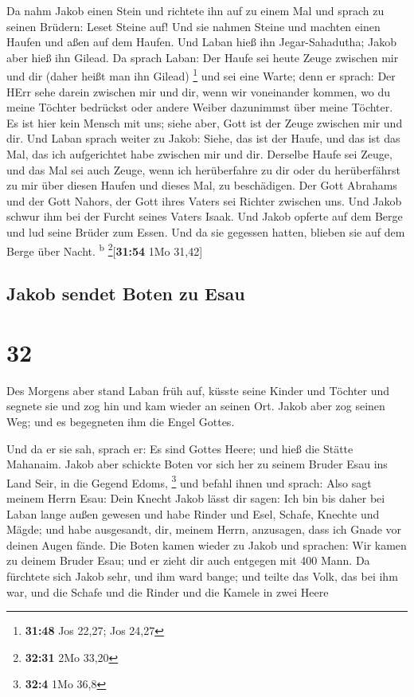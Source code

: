  Da nahm Jakob einen Stein und richtete ihn auf zu einem
Mal  und sprach zu seinen Brüdern: Leset Steine auf! Und
sie nahmen Steine und machten einen Haufen und aßen auf dem Haufen.
 Und Laban hieß ihn Jegar-Sahadutha; Jakob aber hieß ihn
Gilead.  Da sprach Laban: Der Haufe sei heute Zeuge
zwischen mir und dir (daher heißt man ihn Gilead) \footnote{\textbf{31:48}
  Jos 22,27; Jos 24,27}  und sei eine Warte; denn er
sprach: Der HErr sehe darein zwischen mir und dir, wenn wir voneinander
kommen,  wo du meine Töchter bedrückst oder andere Weiber
dazunimmst über meine Töchter. Es ist hier kein Mensch mit uns; siehe
aber, Gott ist der Zeuge zwischen mir und dir.  Und Laban
sprach weiter zu Jakob: Siehe, das ist der Haufe, und das ist das Mal,
das ich aufgerichtet habe zwischen mir und dir.  Derselbe
Haufe sei Zeuge, und das Mal sei auch Zeuge, wenn ich herüberfahre zu
dir oder du herüberfährst zu mir über diesen Haufen und dieses Mal, zu
beschädigen.  Der Gott Abrahams und der Gott Nahors, der
Gott ihres Vaters sei Richter zwischen uns.  Und Jakob
schwur ihm bei der Furcht seines Vaters Isaak. Und Jakob opferte auf dem
Berge und lud seine Brüder zum Essen. Und da sie gegessen hatten,
blieben sie auf dem Berge über Nacht. \textsuperscript{b}
\footnote{\textbf{32:31} 2Mo 33,20}{[}\textbf{31:54} 1Mo 31,42{]}

\hypertarget{jakob-sendet-boten-zu-esau}{%
\subsection{Jakob sendet Boten zu
Esau}\label{jakob-sendet-boten-zu-esau}}

\hypertarget{section-31}{%
\section{32}\label{section-31}}

 Des Morgens aber stand Laban früh auf, küsste seine
Kinder und Töchter und segnete sie und zog hin und kam wieder an seinen
Ort.  Jakob aber zog seinen Weg; und es begegneten ihm die
Engel Gottes.

 Und da er sie sah, sprach er: Es sind Gottes Heere; und
hieß die Stätte Mahanaim.  Jakob aber schickte Boten vor
sich her zu seinem Bruder Esau ins Land Seir, in die Gegend Edoms,
\footnote{\textbf{32:4} 1Mo 36,8}  und befahl ihnen und
sprach: Also sagt meinem Herrn Esau: Dein Knecht Jakob lässt dir sagen:
Ich bin bis daher bei Laban lange außen gewesen  und habe
Rinder und Esel, Schafe, Knechte und Mägde; und habe ausgesandt, dir,
meinem Herrn, anzusagen, dass ich Gnade vor deinen Augen fände.
 Die Boten kamen wieder zu Jakob und sprachen: Wir kamen
zu deinem Bruder Esau; und er zieht dir auch entgegen mit 400 Mann.
 Da fürchtete sich Jakob sehr, und ihm ward bange; und
teilte das Volk, das bei ihm war, und die Schafe und die Rinder und die
Kamele in zwei Heere

